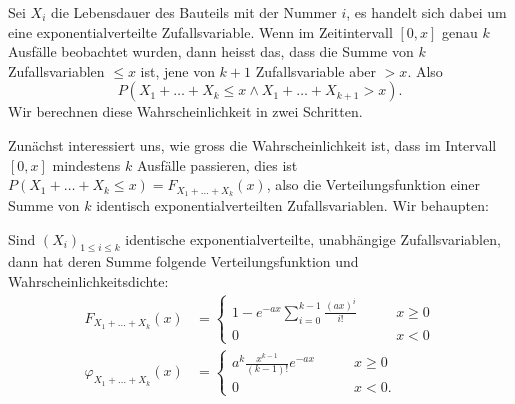 Sei $X_i$ die Lebensdauer des Bauteils mit der Nummer $i$, es handelt
sich dabei um eine exponentialverteilte Zufallsvariable.
Wenn im Zeitintervall
$[0,x]$ genau $k$ Ausfälle beobachtet wurden, dann heisst das, dass die
Summe von $k$ Zufallsvariablen $\le x$ ist, jene von $k+1$ Zufallsvariable
aber $>x$.
Also
\[
P(X_1+\dots+X_k\le x \wedge X_1+\dots+X_{k+1}>x).
\]
Wir berechnen diese Wahrscheinlichkeit in zwei Schritten.

Zunächst interessiert uns, wie gross die Wahrscheinlichkeit ist, dass im
Intervall $[0,x]$ mindestens $k$ Ausfälle passieren, dies ist
$P(X_1+\dots+X_k\le x)=F_{X_1+\dots+X_k}(x)$, also die Verteilungsfunktion
einer Summe von $k$ identisch exponentialverteilten Zufallsvariablen.
Wir behaupten:
\begin{satz}Sind $(X_i)_{1\le i\le k}$ identische exponentialverteilte,
unabhängige Zufallsvariablen, dann hat deren Summe folgende Verteilungsfunktion
und Wahrscheinlichkeitsdichte:
\begin{align*}
F_{X_1+\dots+X_k}(x)&=\begin{cases}
{\displaystyle 1-e^{-ax}\sum_{i=0}^{k-1}\frac{(ax)^i}{i!}}&\qquad x \ge 0\\
0&\qquad x < 0
\end{cases}
\\
\varphi_{X_1+\dots+X_k}(x)&=\begin{cases}
{\displaystyle a^k\frac{x^{k-1}}{(k-1)!}e^{-ax}}&\qquad x\ge0\\
0&\qquad x < 0.
\end{cases}
\end{align*}
\end{satz}
